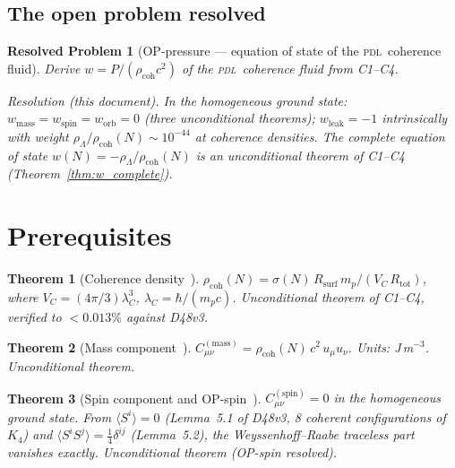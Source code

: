 \documentclass[12pt,a4paper]{article}
\newtheorem{theorem}{Theorem}[section]
\newtheorem{resolvedproblem}{Resolved Problem}
\newcommand{\Kfour}{K_4}
\newcommand{\hb}{\hbar}
\newcommand{\PDL}{\textsc{pdl}}
\newcommand{\Cmass}{C^{(\mathrm{mass})}}
\newcommand{\Cspin}{C^{(\mathrm{spin})}}
\newcommand{\rhocoh}{\rho_{\mathrm{coh}}}
\newcommand{\sig}{\sigma}
\newcommand{\VC}{V_C}
\newcommand{\lambdaC}{\lambda_C}
\newcommand{\rhoLambda}{\rho_\Lambda}
\newcommand{\Rsurf}{R_{\mathrm{surf}}}
\newcommand{\Rtot}{R_{\mathrm{tot}}}
\begin{document}
\subsection{The open problem resolved}

\begin{resolvedproblem}[OP-pressure --- equation of state of the \PDL\ coherence fluid]
\label{rp:OP_pressure}
Derive $w = P/(\rhocoh c^2)$ of the \PDL\ coherence fluid from C1--C4.

\emph{Resolution (this document).} In the homogeneous ground state: $w_{\mathrm{mass}} = w_{\mathrm{spin}} = w_{\mathrm{orb}} = 0$ (three unconditional theorems); $w_{\mathrm{leak}} = -1$ intrinsically with weight $\rhoLambda/\rhocoh(N) \sim 10^{-44}$ at coherence densities. The complete equation of state $w(N) = -\rhoLambda/\rhocoh(N)$ is an unconditional theorem of C1--C4 (Theorem~\ref{thm:w_complete}).
\end{resolvedproblem}

\section{Prerequisites}
\label{sec:prereq}

\begin{theorem}[Coherence density~{\cite{PDL_D48v3_2026}}]
\label{thm:rhocoh}
$\rhocoh(N) = \sig(N)\,\Rsurf\,m_p / (\VC\,\Rtot)$, where $\VC = (4\pi/3)\lambdaC^3$, $\lambdaC = \hb/(m_p c)$. Unconditional theorem of C1--C4, verified to $<0.013\%$ against D48v3.
\end{theorem}

\begin{theorem}[Mass component~{\cite{PDL_D48v3_2026}}]
\label{thm:Cmass}
$\Cmass_{\mu\nu} = \rhocoh(N)\,c^2\,u_\mu u_\nu$. Units: J\,m$^{-3}$. Unconditional theorem.
\end{theorem}

\begin{theorem}[Spin component and OP-spin~{\cite{PDL_D48v3_2026}}]
\label{thm:Cspin}
$\Cspin_{\mu\nu} = 0$ in the homogeneous ground state. From $\langle S^i\rangle = 0$ (Lemma~5.1 of D48v3, 8 coherent configurations of $\Kfour$) and $\langle S^i S^j\rangle = \tfrac{1}{4}\delta^{ij}$ (Lemma~5.2), the Weyssenhoff--Raabe traceless part vanishes exactly. Unconditional theorem (OP-spin resolved).
\end{theorem}
\end{document}

